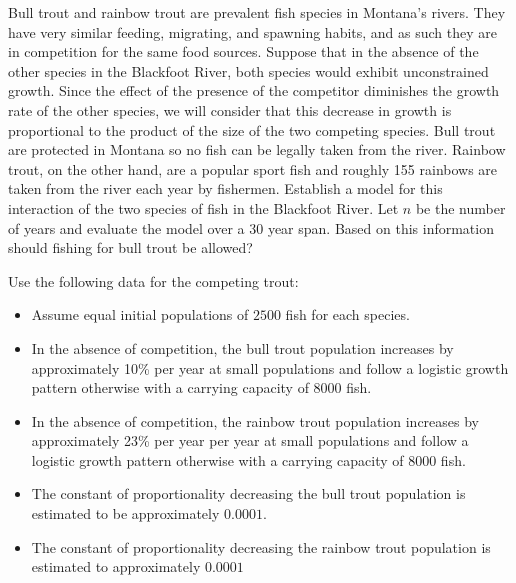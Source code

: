 \begin{problem}
    Bull trout and rainbow trout are prevalent fish species in Montana's rivers.  They
    have very similar feeding, migrating, and spawning habits, and as such they are in
    competition for the same food sources.  Suppose that in the absence of the other
    species in the Blackfoot River, both species would exhibit unconstrained growth.
    Since the effect of the presence of the competitor diminishes the growth rate of the
    other species, we will consider that this decrease in growth is proportional to the
    product of the size of the two competing species. Bull trout are protected in Montana
    so no fish can be legally taken from the river.  Rainbow trout, on the other hand, are
    a popular sport fish and roughly 155 rainbows are taken from the river each year by
    fishermen.  Establish a model for this interaction of the two species of fish in the
    Blackfoot River. Let $n$ be the number of years and evaluate the model over a 30 year
    span. Based on this information should fishing for bull trout be allowed?

    Use the following data for the competing trout:
    \begin{itemize}
        \item Assume equal initial populations of $2500$ fish for each species.
        \item In the absence of competition, the bull trout population increases by
            approximately 10\% per year at small populations and follow a logistic growth
            pattern otherwise with a carrying capacity of 8000 fish.
        \item In the absence of competition, the rainbow trout population increases by
            approximately 23\% per year per year at small populations and follow a
            logistic growth pattern otherwise with a carrying capacity of 8000 fish.
        \item The constant of proportionality decreasing the bull trout population is
            estimated to be approximately $0.0001$.
        \item The constant of proportionality decreasing the rainbow trout population is
            estimated to approximately $0.0001$
    \end{itemize}

\end{problem}




